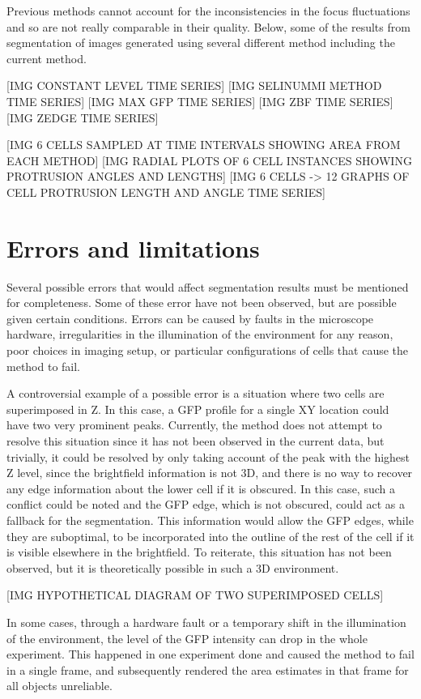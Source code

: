 Previous methods cannot account for the inconsistencies in the focus fluctuations and so are not really comparable in their quality. Below, some of the results from segmentation of images generated using several different method including the current method.

[IMG CONSTANT LEVEL TIME SERIES]
[IMG SELINUMMI METHOD TIME SERIES]
[IMG MAX GFP TIME SERIES]
[IMG ZBF TIME SERIES]
[IMG ZEDGE TIME SERIES]

[IMG 6 CELLS SAMPLED AT TIME INTERVALS SHOWING AREA FROM EACH METHOD]
[IMG RADIAL PLOTS OF 6 CELL INSTANCES SHOWING PROTRUSION ANGLES AND LENGTHS]
[IMG 6 CELLS -> 12 GRAPHS OF CELL PROTRUSION LENGTH AND ANGLE TIME SERIES]

\section{Errors and limitations}

Several possible errors that would affect segmentation results must be mentioned for completeness. Some of these error have not been observed, but are possible given certain conditions. Errors can be caused by faults in the microscope hardware, irregularities in the illumination of the environment for any reason, poor choices in imaging setup, or particular configurations of cells that cause the method to fail.

A controversial example of a possible error is a situation where two cells are superimposed in Z. In this case, a GFP profile for a single XY location could have two very prominent peaks. Currently, the method does not attempt to resolve this situation since it has not been observed in the current data, but trivially, it could be resolved by only taking account of the peak with the highest Z level, since the brightfield information is not 3D, and there is no way to recover any edge information about the lower cell if it is obscured. In this case, such a conflict could be noted and the GFP edge, which is not obscured, could act as a fallback for the segmentation. This information would allow the GFP edges, while they are suboptimal, to be incorporated into the outline of the rest of the cell if it is visible elsewhere in the brightfield. To reiterate, this situation has not been observed, but it is theoretically possible in such a 3D environment.

[IMG HYPOTHETICAL DIAGRAM OF TWO SUPERIMPOSED CELLS]

In some cases, through a hardware fault or a temporary shift in the illumination of the environment, the level of the GFP intensity can drop in the whole experiment. This happened in one experiment done and caused the method to fail in a single frame, and subsequently rendered the area estimates in that frame for all objects unreliable.

